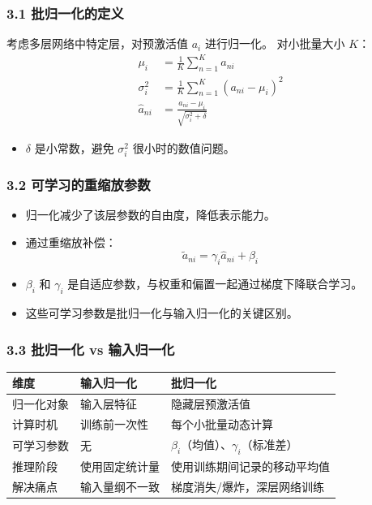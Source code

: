 \documentclass[t,aspectratio=169]{beamer} %
\begin{document}
\begin{frame}
    \frametitle{3.1 批归一化的定义}
    考虑多层网络中特定层，对\alert{预激活值} $a_i$ 进行归一化。
    对小批量大小 $K$：
    \begin{align}
        \mu_i &= \frac{1}{K} \sum_{n=1}^K a_{ni} \tag{7.52} \\
        \sigma_i^2 &= \frac{1}{K} \sum_{n=1}^K (a_{ni} - \mu_i)^2 \tag{7.53} \\
        \widehat{a}_{ni} &= \frac{a_{ni} - \mu_i}{\sqrt{\sigma_i^2 + \delta}} \tag{7.54}
    \end{align}
    \begin{itemize}
        \item $\delta$ 是小常数，避免 $\sigma_i^2$ 很小时的数值问题。
    \end{itemize}
\end{frame}

\begin{frame}
    \frametitle{3.2 可学习的重缩放参数}
    \begin{itemize}
        \item 归一化减少了该层参数的\alert{自由度}，降低表示能力。
        \item 通过\alert{重缩放}补偿：
        \begin{equation}
            \widetilde{a}_{ni} = \gamma_i \widehat{a}_{ni} + \beta_i \tag{7.55}
        \end{equation}
        \item $\beta_i$ 和 $\gamma_i$ 是\alert{自适应参数}，与权重和偏置一起通过梯度下降联合学习。
        \item 这些可学习参数是批归一化与输入归一化的\alert{关键区别}。
    \end{itemize}
\end{frame}

\begin{frame}
    \frametitle{3.3 批归一化 vs 输入归一化}
    \begin{table}
        \centering
        \renewcommand{\arraystretch}{1.2}
        \footnotesize
        \begin{tabular}{|p{2.2cm}|p{3.5cm}|p{4.5cm}|}
            \hline
            \textbf{维度} & \textbf{输入归一化} & \textbf{批归一化} \\
            \hline
            归一化对象 & 输入层特征 & 隐藏层预激活值 \\
            \hline
            计算时机 & 训练前一次性 & 每个小批量动态计算 \\
            \hline
            可学习参数 & 无 & $\beta_i$（均值）、$\gamma_i$（标准差） \\
            \hline
            推理阶段 & 使用固定统计量 & 使用训练期间记录的移动平均值 \\
            \hline
            解决痛点 & 输入量纲不一致 & 梯度消失/爆炸，深层网络训练 \\
            \hline
        \end{tabular}
    \end{table}
\end{frame}
\end{document}
